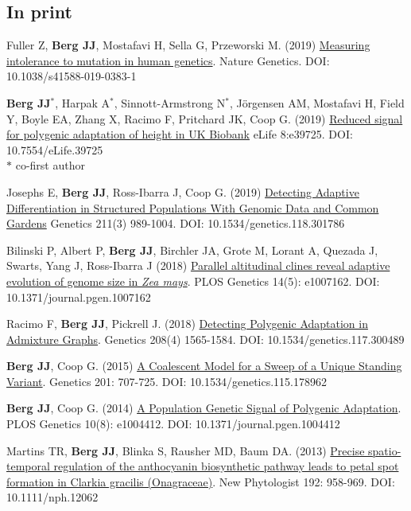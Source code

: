 \documentclass[letterpaper]{article}
\begin{document}
\subsection*{In print}
\begin{etaremune}
  \item Fuller Z, \textbf{Berg JJ}, Mostafavi H, Sella G, Przeworski M. (2019) \href{https://www.nature.com/articles/s41588-019-0383-1}{Measuring intolerance to mutation in human genetics}. Nature Genetics. DOI: 10.1038/s41588-019-0383-1
  \item \textbf{Berg JJ}$^*$, Harpak A$^*$, Sinnott-Armstrong N$^*$, J{\"o}rgensen AM, Mostafavi H, Field Y, Boyle EA, Zhang X, Racimo F, Pritchard JK, Coop G. (2019) \href{https://elifesciences.org/articles/39725}{Reduced signal for polygenic adaptation of height in UK Biobank} eLife 8:e39725. DOI: 10.7554/eLife.39725\\
   $*$ co-first author
  \item Josephs E, \textbf{Berg JJ}, Ross-Ibarra J, Coop G. (2019) \href{http://www.genetics.org/content/211/3/989.abstract}{Detecting Adaptive Differentiation in Structured Populations With Genomic Data and Common Gardens} Genetics 211(3) 989-1004. DOI: 10.1534/genetics.118.301786 
  \item Bilinski P, Albert P, \textbf{Berg JJ}, Birchler JA, Grote M, Lorant A, Quezada J, Swarts, Yang J, Ross-Ibarra J (2018) \href{https://journals.plos.org/plosgenetics/article?id=10.1371/journal.pgen.1007162}{Parallel altitudinal clines reveal adaptive evolution of genome size in \textit{Zea mays}}. PLOS Genetics 14(5): e1007162. DOI: 10.1371/journal.pgen.1007162
  \item Racimo F, {\bf Berg JJ}, Pickrell J. (2018) \href{http://www.genetics.org/content/208/4/1565.abstract}{Detecting Polygenic Adaptation in Admixture Graphs}. Genetics 208(4) 1565-1584. DOI: 10.1534/genetics.117.300489
  \item {\bf Berg JJ}, Coop G. (2015)  \href{http://www.genetics.org/content/201/2/707}{A Coalescent Model for a Sweep of a Unique Standing Variant}. Genetics 201: 707-725. DOI: 10.1534/genetics.115.178962
  \item {\bf Berg JJ}, Coop G. (2014)  \href{https://journals.plos.org/plosgenetics/article?id=10.1371/journal.pgen.1004412}{A Population Genetic Signal of Polygenic Adaptation}. PLOS Genetics 10(8): e1004412. DOI: 10.1371/journal.pgen.1004412
  \item Martins TR,  {\bf Berg JJ}, Blinka S, Rausher MD, Baum DA. (2013) \href{https://nph.onlinelibrary.wiley.com/doi/full/10.1111/nph.12062}{Precise spatio-temporal regulation of the anthocyanin biosynthetic pathway leads to petal spot formation in Clarkia gracilis (Onagraceae)}. New Phytologist 192: 958-969. DOI: 10.1111/nph.12062 


\end{etaremune}
\end{document}
